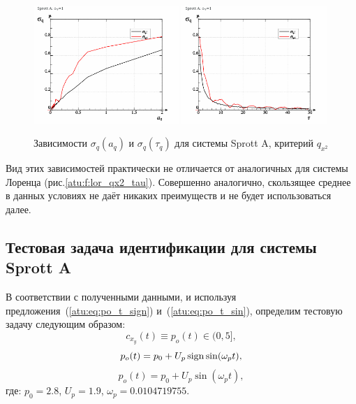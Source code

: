 \begin{figure}[htb!]
\begin{center}
  \includegraphics[width=0.49\textwidth]{p/cha/spr_a/sprott_a_qx2_tau-p_aq_sd.png}
  \hfill
  \includegraphics[width=0.49\textwidth]{p/cha/spr_a/sprott_a_qx2_tau-p_tau_sd.png}
\end{center}
  \caption{Зависимости $\sigma_{q}(a_q)$ и $\sigma_{q}(\tau_q)$ для системы Sprott A, критерий  $q_{x^2}$}
\label{atu:f:spr_a_qx2_tau}
\end{figure}

Вид этих зависимостей практически не отличается
от аналогичных для системы Лоренца (рис.\ref{atu:f:lor_qx2_tau}).
Совершенно аналогично, скользящее среднее в данных условиях
не даёт никаких преимуществ и не будет использоваться далее.



\subsection{Тестовая задача идентификации для системы Sprott A}   %

В соответствии с полученными данными, и используя
предложения~(\ref{atu:eq:po_t_sign}) и~(\ref{atu:eq:po_t_sin}),
определим тестовую задачу следующим образом:
\[
  c_{x_y}(t) \equiv p_o(t) \in (0, 5],
\]
%
\begin{equation}
  p_o(t) = p_0 +  U_{p} \operatorname*{sign} \sin( \omega_{p} t ),
  \label{atu:eq:spr_a_po_t_sign}
\end{equation}
%
%
\begin{equation}
  p_o(t) = p_0 +  U_{p} \sin( \omega_{p} t ),
  \label{atu:eq:spr_a_po_t_sin}
\end{equation}
%
где:
$p_0 = 2.8$, $U_p=1.9$, $\omega_p=0.0104719755$.

